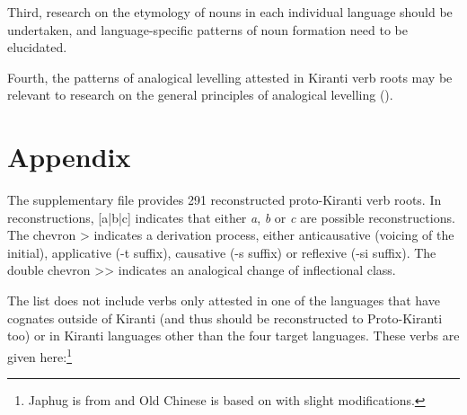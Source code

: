 \documentclass[oneside,a4paper,11pt]{article}
\newcommand{\ipa}[1]{{\phon\mbox{#1}}} %
\begin{document}
Third, research on the etymology of nouns in each individual language should be undertaken, and language-specific patterns of noun formation need to be elucidated.


Fourth, the patterns of analogical levelling attested in Kiranti verb roots may be relevant to research on the general principles of analogical levelling (\citealt{hill07ausgleich, hill14conditioned,jacques16ebde}).


\section*{Appendix} \label{sec:appendix}
The supplementary file provides 291 reconstructed proto-Kiranti verb roots. In reconstructions, [a|b|c] indicates that either \textit{a}, \textit{b} or \textit{c} are possible reconstructions. The chevron > indicates a derivation process, either anticausative (voicing of the initial), applicative (\ipa{-t} suffix), causative (\ipa{-s} suffix) or reflexive (\ipa{-si} suffix). The double chevron {>}{>} indicates an analogical change of inflectional class.

The list does not include verbs only attested in one of the languages that have cognates outside of Kiranti (and thus should be reconstructed to Proto-Kiranti too) or in Kiranti languages other than the four target languages. These verbs are given here:\footnote{Japhug is from \citet{jacques16japhug} and Old Chinese is based on \citealt{bs14oc} with slight modifications. }
\end{document}
